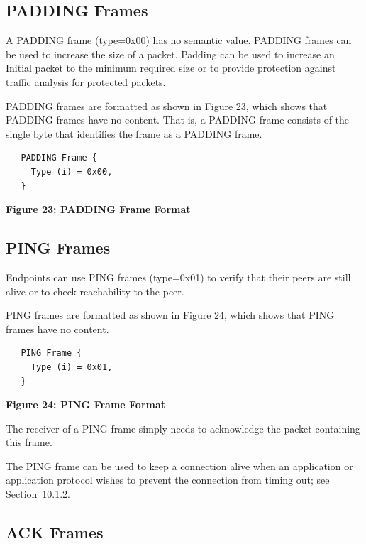 \documentclass{article}
\begin{document}
\subsection{PADDING Frames}

A PADDING frame (type=0x00) has no semantic value.  PADDING frames can be used to increase the size of a packet.  Padding can be used to increase an Initial packet to the minimum required size or to provide protection against traffic analysis for protected packets.

PADDING frames are formatted as shown in Figure 23, which shows that PADDING frames have no content.  That is, a PADDING frame consists of the single byte that identifies the frame as a PADDING frame.

\begin{verbatim}
   PADDING Frame {
     Type (i) = 0x00,
   }
\end{verbatim}

\begin{center}
\textbf{Figure 23: PADDING Frame Format}
\end{center}

\subsection{PING Frames}

Endpoints can use PING frames (type=0x01) to verify that their peers are still alive or to check reachability to the peer.

PING frames are formatted as shown in Figure 24, which shows that PING frames have no content.

\begin{verbatim}
   PING Frame {
     Type (i) = 0x01,
   }
\end{verbatim}

\begin{center}
\textbf{Figure 24: PING Frame Format}
\end{center}

The receiver of a PING frame simply needs to acknowledge the packet containing this frame.

The PING frame can be used to keep a connection alive when an application or application protocol wishes to prevent the connection from timing out; see Section~10.1.2.

\subsection{ACK Frames}
\end{document}
